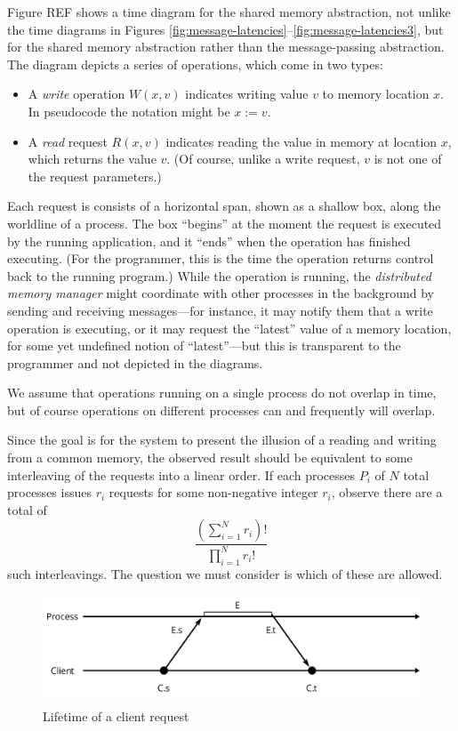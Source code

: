 \documentclass[]             %
{NASA}                       %
\theoremstyle{definition}
\begin{document}
Figure REF shows a time diagram for the shared memory abstraction, not
unlike the time diagrams in Figures
\ref{fig:message-latencies}--\ref{fig:message-latencies3}, but for the
shared memory abstraction rather than the message-passing
abstraction. The diagram depicts a series of operations, which come in
two types:
\begin{itemize}
  \item A \emph{write} operation $W(x, v)$ indicates writing value $v$
    to memory location $x$. In pseudocode the notation might be $x :=
    v$.
  \item A \emph{read} request $R(x, v)$ indicates reading the value in
    memory at location $x$, which returns the value $v$. (Of course,
    unlike a write request, $v$ is not one of the request parameters.)
\end{itemize}
Each request is consists of a horizontal span, shown as a shallow box,
along the worldline of a process. The box ``begins'' at the moment the
request is executed by the running application, and it ``ends'' when
the operation has finished executing. (For the programmer, this is the
time the operation returns control back to the running program.) While
the operation is running, the \emph{distributed memory manager} might
coordinate with other processes in the background by sending and
receiving messages---for instance, it may notify them that a write
operation is executing, or it may request the ``latest'' value of a
memory location, for some yet undefined notion of ``latest''---but
this is transparent to the programmer and not depicted in the
diagrams.

We assume that operations running on a single process do not overlap
in time, but of course operations on different processes can and
frequently will overlap.


Since the goal is for the system to present
the illusion of a reading and writing from a common memory, the
observed result should be equivalent to some interleaving of the
requests into a linear order. If each processes $P_i$ of $N$ total
processes issues $r_i$ requests for some non-negative integer $r_i$,
observe there are a total of
\[
\frac{\left(\sum_{i = 1}^N r_i\right)!}{\prod_{i = 1}^N r_i!}
\]
such interleavings. The question we must consider is which of these
are allowed.

\begin{figure}[p]
  \center
  \includegraphics[scale=0.4]{images/request.png}
  \caption{Lifetime of a client request}
  \label{fig:request}
\end{figure}
\end{document}
